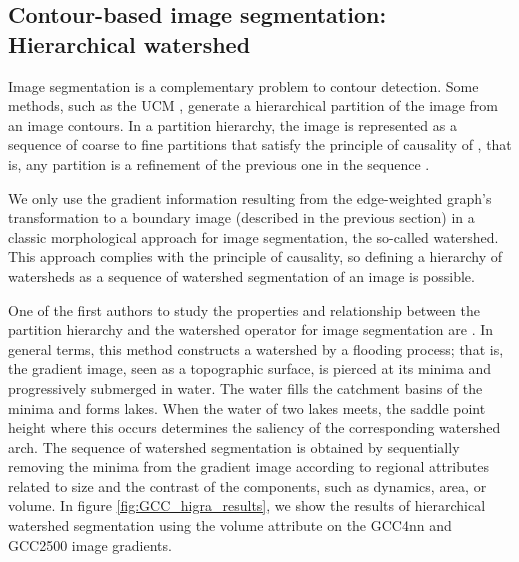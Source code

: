 \subsection{Contour-based image segmentation: Hierarchical watershed}

Image segmentation is a complementary problem to contour detection. Some methods, such as the UCM \citep{Arbelaez.Maire.ea:PR:2009}, generate a hierarchical partition of the image from an image contours. In a partition hierarchy, the image is represented as a sequence of coarse to fine partitions that satisfy the principle of causality of \cite{Koenderink:BC:1984}, that is, any partition is a refinement of the previous one in the sequence \citep{Perret.Cousty.ea:TIP:2018}.

We only use the gradient information resulting from the edge-weighted graph's transformation to a boundary image (described in the previous section) in a classic morphological approach for image segmentation, the so-called watershed. This approach complies with the principle of causality, so defining a hierarchy of watersheds as a sequence of watershed segmentation of an image is possible. 

One of the first authors to study the properties and relationship between the partition hierarchy and the watershed operator for image segmentation are \citep{Najman.Schmitt:PAMI:1996}. In general terms, this method constructs a watershed by a flooding process; that is, the gradient image, seen as a topographic surface, is pierced at its minima and progressively submerged in water. The water fills the catchment basins of the minima and forms lakes. When the water of two lakes meets, the saddle point height where this occurs determines the saliency of the corresponding watershed arch. The sequence of watershed segmentation is obtained by sequentially removing the minima from the gradient image according to regional attributes related to size and the contrast of the components, such as dynamics, area, or volume. In figure \ref{fig:GCC_higra_results}, we show the results of hierarchical watershed segmentation using the volume attribute on the GCC4nn and GCC2500 image gradients. 


